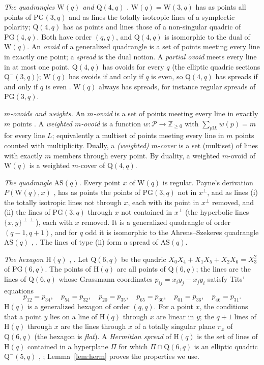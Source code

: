 \documentclass[11pt]{amsart}
\theoremstyle{definition}
\theoremstyle{remark}
\newcommand{\cP}{\mathcal{P}}
\newcommand{\I}{\mathrel{\mathrm{I}}}
\newcommand{\PG}{\mathrm{PG}}
\newcommand{\Hq}{\mathrm{H}}
\newcommand{\AS}{\mathrm{AS}}
\newcommand{\Wq}{\mathrm{W}}
\newcommand{\Qf}{\mathrm{Q}}
\begin{document}
\emph{The quadrangles $\Wq(q)$ and $\Qf(4,q)$} \cite[3.1.1, 3.2.1]{PT}. $\Wq(q)=\Wq(3,q)$ has as points all points of $\PG(3,q)$ and as lines the totally isotropic lines of a symplectic polarity; $\Qf(4,q)$ has as points and lines those of a non-singular quadric of $\PG(4,q)$. Both have order $(q,q)$, and $\Qf(4,q)$ is isomorphic to the dual of $\Wq(q)$. An \emph{ovoid} of a generalized quadrangle is a set of points meeting every line in exactly one point; a \emph{spread} is the dual notion. A \emph{partial ovoid} meets every line in at most one point. $\Qf(4,q)$ has ovoids for every $q$ (the elliptic quadric sections $\Qf^-(3,q)$); $\Wq(q)$ has ovoids if and only if $q$ is even, so $\Qf(4,q)$ has spreads if and only if $q$ is even \cite[3.4.1]{PT}. $\Wq(q)$ always has spreads, for instance regular spreads of $\PG(3,q)$.

\emph{$m$-ovoids and weights.} An \emph{$m$-ovoid} is a set of points meeting every line in exactly $m$ points \cite{BLP09}. A \emph{weighted $m$-ovoid} is a function $w\colon\cP\to\mathbb Z_{\ge0}$ with $\sum_{p\I L}w(p)=m$ for every line $L$; equivalently a multiset of points meeting every line in $m$ points counted with multiplicity. Dually, a \emph{(weighted) $m$-cover} is a set (multiset) of lines with exactly $m$ members through every point. By duality, a weighted $m$-ovoid of $\Wq(q)$ is a weighted $m$-cover of $\Qf(4,q)$.

\emph{The quadrangle $\AS(q)$.} Every point $x$ of $\Wq(q)$ is regular. Payne's derivation $P(\Wq(q),x)$ \cite{P71}, \cite[3.1.4]{PT} has as points the points of $\PG(3,q)$ not in $x^\perp$, and as lines (i) the totally isotropic lines not through $x$, each with its point in $x^\perp$ removed, and (ii) the lines of $\PG(3,q)$ through $x$ not contained in $x^\perp$ (the hyperbolic lines $\{x,y\}^{\perp\perp}$), each with $x$ removed. It is a generalized quadrangle of order $(q-1,q+1)$, and for $q$ odd it is isomorphic to the Ahrens--Szekeres quadrangle $\AS(q)$ \cite{AS69}, \cite[3.1.5, 3.2.6]{PT}. The lines of type (ii) form a spread of $\AS(q)$.

\emph{The hexagon $\Hq(q)$} \cite{T59}, \cite[\S2.4]{VM98}. Let $\Qf(6,q)$ be the quadric $X_0X_4+X_1X_5+X_2X_6=X_3^2$ of $\PG(6,q)$. The points of $\Hq(q)$ are all points of $\Qf(6,q)$; the lines are the lines of $\Qf(6,q)$ whose Grassmann coordinates $p_{ij}=x_iy_j-x_jy_i$ satisfy Tits' equations
\[
p_{12}=p_{34},\quad p_{54}=p_{32},\quad p_{20}=p_{35},\quad p_{65}=p_{30},\quad p_{01}=p_{36},\quad p_{46}=p_{31}.
\]
$\Hq(q)$ is a generalized hexagon of order $(q,q)$. For a point $x$, the conditions that a point $y$ lies on a line of $\Hq(q)$ through $x$ are linear in $y$; the $q+1$ lines of $\Hq(q)$ through $x$ are the lines through $x$ of a totally singular plane $\pi_x$ of $\Qf(6,q)$ (the hexagon is \emph{flat}). A \emph{Hermitian spread} of $\Hq(q)$ is the set of lines of $\Hq(q)$ contained in a hyperplane $\Pi$ for which $\Pi\cap\Qf(6,q)$ is an elliptic quadric $\Qf^-(5,q)$ \cite{T80}, \cite{VM98}; Lemma~\ref{lem:herm} proves the properties we use.
\end{document}
